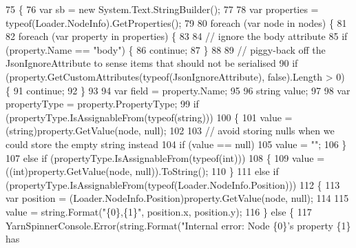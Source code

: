 \begin{DoxyCode}
75         \{
76             var sb = \textcolor{keyword}{new} System.Text.StringBuilder();
77 
78             var properties = typeof(Loader.NodeInfo).GetProperties();
79 
80             \textcolor{keywordflow}{foreach} (var node \textcolor{keywordflow}{in} nodes) \{
81 
82                 \textcolor{keywordflow}{foreach} (var property \textcolor{keywordflow}{in} properties) \{
83 
84                     \textcolor{comment}{// ignore the body attribute}
85                     \textcolor{keywordflow}{if} (property.Name == \textcolor{stringliteral}{"body"}) \{
86                         \textcolor{keywordflow}{continue};
87                     \}
88 
89                     \textcolor{comment}{// piggy-back off the JsonIgnoreAttribute to sense items that should not be serialised}
90                     \textcolor{keywordflow}{if} (property.GetCustomAttributes(typeof(JsonIgnoreAttribute), \textcolor{keyword}{false}).Length > 0) \{
91                         \textcolor{keywordflow}{continue};
92                     \}
93 
94                     var field = property.Name;
95 
96                     \textcolor{keywordtype}{string} value;
97 
98                     var propertyType = property.PropertyType;
99                     \textcolor{keywordflow}{if} (propertyType.IsAssignableFrom(typeof(\textcolor{keywordtype}{string})))
100                     \{
101                         value = (string)property.GetValue(node, null);
102 
103                         \textcolor{comment}{// avoid storing nulls when we could store the empty string instead}
104                         \textcolor{keywordflow}{if} (value == null)
105                             value = \textcolor{stringliteral}{""};
106                     \}
107                     \textcolor{keywordflow}{else} \textcolor{keywordflow}{if} (propertyType.IsAssignableFrom(typeof(\textcolor{keywordtype}{int})))
108                     \{
109                         value = ((int)property.GetValue(node, null)).ToString();
110                     \}
111                     \textcolor{keywordflow}{else} \textcolor{keywordflow}{if} (propertyType.IsAssignableFrom(typeof(Loader.NodeInfo.Position)))
112                     \{
113                         var position = (Loader.NodeInfo.Position)property.GetValue(node, null);
114 
115                         value = string.Format(\textcolor{stringliteral}{"\{0\},\{1\}"}, position.x, position.y);
116                     \} \textcolor{keywordflow}{else} \{
117                         YarnSpinnerConsole.Error(string.Format(\textcolor{stringliteral}{"Internal error: Node \{0\}'s property \{1\} has
}
\end{DoxyCode}
